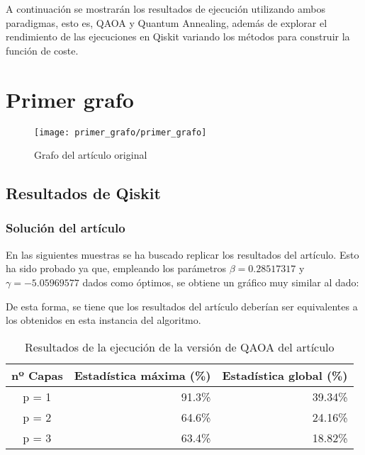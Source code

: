 \documentclass{article}
\begin{document}
A continuación se mostrarán los resultados de ejecución utilizando ambos paradigmas, esto es, QAOA y Quantum Annealing, además de explorar el rendimiento de las ejecuciones en Qiskit variando los métodos para construir la función de coste.

\newpage
\section{Primer grafo}

\begin{figure}[htbp]
  \centering
  \texttt{[image: primer\_grafo/primer\_grafo]}
  \caption{Grafo del artículo original}
\end{figure}

\subsection{Resultados de Qiskit}

\subsubsection{Solución del artículo}
\label{sec:5-primer-paper-resultados_qiskit}
En las siguientes muestras se ha buscado replicar los resultados del artículo. Esto ha sido probado ya que, empleando los parámetros \(\beta = 0.28517317\) y \(\gamma = -5.05969577 \) dados como óptimos, se obtiene un gráfico muy similar al dado: \\

\begin{figure}[htbp]
  \centering
  \caption{} \label{fig:5-primer_grafo/sin_restriccion_extra/primer_paper_aer_resultado}
\end{figure}

De esta forma, se tiene que los resultados del artículo deberían ser equivalentes a los obtenidos en esta instancia del algoritmo.

\begin{table}[htbp]
  \centering
  \begin{tabular}{|c|r|r|}
    \hline
    \textbf{nº Capas} & \textbf{Estadística máxima (\%)} & \textbf{Estadística global (\%)} \\ \hline
    p = 1 & 91.3\% & 39.34\% \\ \hline
    p = 2 & 64.6\% & 24.16\% \\ \hline
    p = 3 & 63.4\% & 18.82\% \\ \hline
  \end{tabular}
  \caption{Resultados de la ejecución de la versión de QAOA del artículo}
  \label{tab:5-primer-paper-aer_estadisticas}
\end{table}
\end{document}
